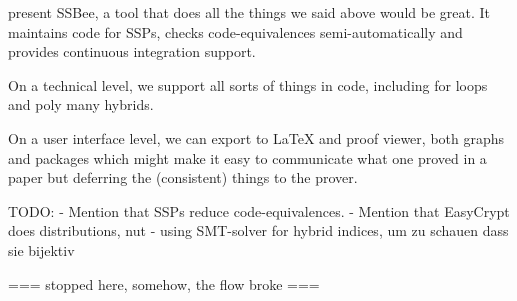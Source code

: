 present SSBee, a tool that does all the things
we said above would be great. It maintains code for SSPs, checks code-equivalences
semi-automatically and provides continuous integration support.

On a technical level, we support all sorts of things in code, including for loops
and poly many hybrids.

On a user interface level, we can export to LaTeX and proof viewer, both graphs and packages which might make it easy to communicate what one proved in a paper but
deferring the (consistent) things to the prover.















TODO:
- Mention that SSPs reduce code-equivalences.
- Mention that EasyCrypt does distributions, nut 
- using SMT-solver for hybrid indices, um zu schauen dass sie bijektiv





=== stopped here, somehow, the flow broke ===

